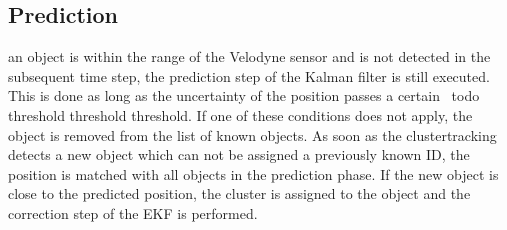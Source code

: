 \documentclass[11pt,oneside,openright]{mpreport}
\begin{document}
% 
% 

\subsection{Prediction}

an object is within the range of the Velodyne sensor and is not detected in the subsequent time step, the prediction step of the Kalman filter is still executed.
This is done as long as the uncertainty of the position passes a certain \ todo {threshold threshold} threshold. If one of these conditions does not apply,
the object is removed from the list of known objects. As soon as the clustertracking detects a new object which can not be assigned a previously known ID, 
the position is matched with all objects in the prediction phase. If the new object is close to the predicted position, the cluster is assigned to the object
and the correction step of the EKF is performed.
\end{document}
